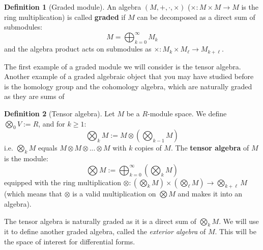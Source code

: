 \documentclass[11pt, oneside]{amsart}   	%
\theoremstyle{definition}
\newtheorem{definition}{Definition}[section]
\begin{document}
\begin{definition}[Graded module]
	An algebra $(M, +, \cdot, \times)$ ($\times : M\times M\rightarrow M$ is the ring multiplication) is called \textbf{graded} if 
	$M$ can be decomposed as a direct sum of submodules:
	\begin{equation}
		M = \bigoplus_{k = 0}^\infty M_k
	\end{equation}
	and the algebra product acts on submodules as $\times : M_k\times M_\ell\rightarrow M_{k + \ell}$. 
\end{definition}
The first example of a graded module we will consider is the tensor algebra. Another example of a graded algebraic object 
that you may have studied before is the homology group and the cohomology algebra, which are naturally graded as 
they are sums of 

\begin{definition}[Tensor algebra]
	Let $M$ be a $R$-module space. We define $\bigotimes_0 V := R$, and for $k\geq 1$:
	\begin{equation}
		\bigotimes_k M := M\otimes\left(\bigotimes_{k - 1} M\right)
	\end{equation}
	i.e. $\bigotimes_k M$ equals $M\otimes M\otimes ...\otimes M$ with $k$ copies of $M$. The \textbf{tensor algebra} of 
	$M$ is the module:
	\begin{equation}
		\bigotimes M := \bigoplus_{k = 0}^\infty \left(\bigotimes_k M\right)
	\end{equation}
	equipped with the ring multiplication $\otimes: (\bigotimes_k M)\times (\bigotimes_\ell M)\rightarrow 
	\bigotimes_{k + \ell} M$ (which means that $\otimes$ is a valid multiplication on $\bigotimes M$ and makes it into an 
	algebra). 
\end{definition}
The tensor algebra is naturally graded as it is a direct sum of $\bigotimes_k M$. We will use it to define another graded 
algebra, called the \textit{exterior algebra} of $M$. This will be the space of interest for differential forms. 
\end{document}
